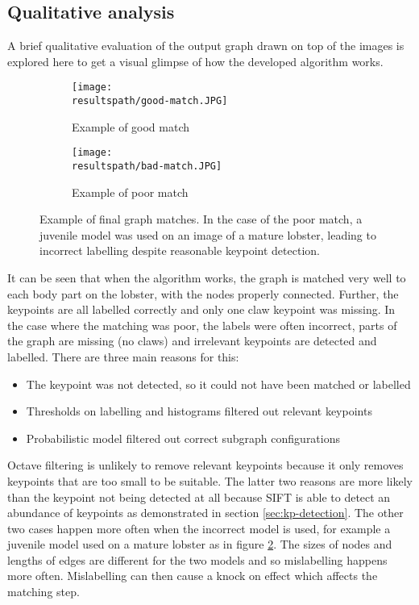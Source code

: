 \subsection{Qualitative analysis}
A brief qualitative evaluation of the output graph drawn on top of the images is explored here to get a visual glimpse of how the developed algorithm works.
\begin{figure}[H]
	\begin{subfigure}{0.45\textwidth}
	\texttt{[image: \\resultspath/good-match.JPG]}
	\caption{Example of good match}
	\end{subfigure}
	\hspace*{\fill}
	\begin{subfigure}{0.45\textwidth}
	\texttt{[image: \\resultspath/bad-match.JPG]}
	\caption{Example of poor match}
	\label{fig:poor-match}
	\end{subfigure}
\caption{Example of final graph matches. In the case of the poor match, a juvenile model was used on an image of a mature lobster, leading to incorrect labelling despite reasonable keypoint detection.}
\end{figure}
\noindent
It can be seen that when the algorithm works, the graph is matched very well to each body part on the lobster, with the nodes properly connected. Further, the keypoints are all labelled correctly and only one claw keypoint was missing. In the case where the matching was poor, the labels were often incorrect, parts of the graph are missing (no claws) and irrelevant keypoints are detected and labelled. There are three main reasons for this:
\begin{itemize}
\item The keypoint was not detected, so it could not have been matched or labelled
\item Thresholds on labelling and histograms filtered out relevant keypoints
\item Probabilistic model filtered out correct subgraph configurations 
\end{itemize}
Octave filtering is unlikely to remove relevant keypoints because it only removes keypoints that are too small to be suitable. The latter two reasons are more likely than the keypoint not being detected at all because SIFT is able to detect an abundance of keypoints as demonstrated in section \ref{sec:kp-detection}. The other two cases happen more often when the incorrect model is used, for example a juvenile model used on a mature lobster as in figure \ref{fig:poor-match}. The sizes of nodes and lengths of edges are different for the two models and so mislabelling happens more often. Mislabelling can then cause a knock on effect which affects the matching step.

